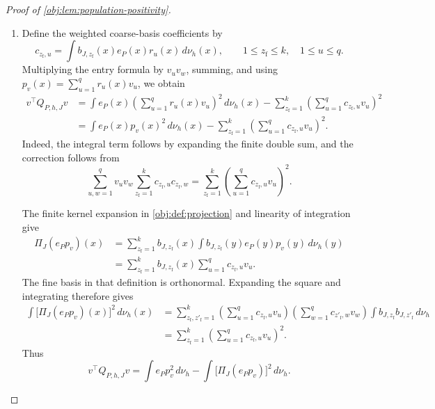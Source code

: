 \documentclass[11pt]{article}
\begin{document}
\begin{proof}[Proof of \cref{obj:lem:population-positivity}]
\begin{enumerate}
\item Define the weighted coarse-basis coefficients by
\[
c_{z_{\mathrm f},u}
=\int b_{J,z_{\mathrm f}}(x)e_P(x)r_u(x)\,d\nu_h(x),
\qquad
1\le z_{\mathrm f}\le k,\quad 1\le u\le q.
\]
Multiplying the entry formula by \(v_uv_w\), summing, and using
\(p_v(x)=\sum_{u=1}^{q}r_u(x)v_u\), we obtain
\[
\begin{aligned}
v^\top Q_{P,h,J}v
&=\int e_P(x)
 \left(\sum_{u=1}^{q}r_u(x)v_u\right)^2\,d\nu_h(x)
 -\sum_{z_{\mathrm f}=1}^{k}
 \left(\sum_{u=1}^{q}c_{z_{\mathrm f},u}v_u\right)^2\\
&=\int e_P(x)p_v(x)^2\,d\nu_h(x)
 -\sum_{z_{\mathrm f}=1}^{k}
 \left(\sum_{u=1}^{q}c_{z_{\mathrm f},u}v_u\right)^2.
\end{aligned}
\]
Indeed, the integral term follows by expanding the finite double sum, and the correction follows from
\[
\sum_{u,w=1}^{q}v_uv_w
 \sum_{z_{\mathrm f}=1}^{k}c_{z_{\mathrm f},u}c_{z_{\mathrm f},w}
=
\sum_{z_{\mathrm f}=1}^{k}
 \left(\sum_{u=1}^{q}c_{z_{\mathrm f},u}v_u\right)^2.
\]

The finite kernel expansion in \cref{obj:def:projection} and linearity of integration give
\[
\begin{aligned}
\Pi_J(e_Pp_v)(x)
&=\sum_{z_{\mathrm f}=1}^{k}b_{J,z_{\mathrm f}}(x)
 \int b_{J,z_{\mathrm f}}(y)e_P(y)p_v(y)\,d\nu_h(y)\\
&=\sum_{z_{\mathrm f}=1}^{k}b_{J,z_{\mathrm f}}(x)
 \sum_{u=1}^{q}c_{z_{\mathrm f},u}v_u.
\end{aligned}
\]
The fine basis in that definition is orthonormal. Expanding the square and integrating therefore gives
\[
\begin{aligned}
\int \bigl[\Pi_J(e_Pp_v)(x)\bigr]^2\,d\nu_h(x)
&=\sum_{z_{\mathrm f},z'_{\mathrm f}=1}^{k}
 \left(\sum_{u=1}^{q}c_{z_{\mathrm f},u}v_u\right)
 \left(\sum_{w=1}^{q}c_{z'_{\mathrm f},w}v_w\right)
 \int b_{J,z_{\mathrm f}}b_{J,z'_{\mathrm f}}\,d\nu_h\\
&=\sum_{z_{\mathrm f}=1}^{k}
 \left(\sum_{u=1}^{q}c_{z_{\mathrm f},u}v_u\right)^2.
\end{aligned}
\]
Thus
\[
v^\top Q_{P,h,J}v
=\int e_Pp_v^2\,d\nu_h
 -\int \bigl[\Pi_J(e_Pp_v)\bigr]^2\,d\nu_h.
\]


\end{enumerate}
\end{proof}
\end{document}
